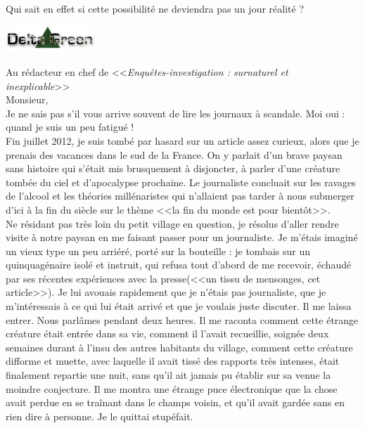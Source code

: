 \documentclass[11pt,twoside,a4paper]{article}
\begin{document}
Qui sait en effet si cette possibilit{\'e} ne deviendra pas un jour r{\'e}alit{\'e} ? ~\\

\vfill

\begin{center} \includegraphics[width=0.25\textwidth]{logo_DG.jpg} \end{center}

\vfill

\clearpage

\begin{minipage}[ht]{0.75\textwidth}
	\begin{ttfamily}	\footnotesize %
		Au r{\'e}dacteur en chef de <<\emph{Enqu{\^e}tes-investigation : surnaturel et inexplicable}>>~\\

Monsieur, ~\\

Je ne sais pas s'il vous arrive souvent de lire les journaux {\`a} scandale. Moi oui : quand je suis un peu fatigu{\'e} !~\\

Fin juillet 2012, je suis tomb{\'e} par hasard sur un article assez curieux, alors que je prenais des vacances dans le sud de la France. On y parlait d'un brave paysan sans histoire qui s'{\'e}tait mis brusquement {\`a} disjoncter, {\`a} parler d'une cr{\'e}ature tomb{\'e}e du ciel et d'apocalypse prochaine. Le journaliste concluait sur les ravages de l'alcool et les th{\'e}ories mill{\'e}naristes qui n'allaient pas tarder {\`a} nous submerger d'ici {\`a} la fin du si{\`e}cle sur le th{\`e}me <<la fin du monde est pour bient{\^o}t>>. ~\\ 

Ne r{\'e}sidant pas tr{\`e}s loin du petit village en question, je r{\'e}solus d'aller rendre visite {\`a} notre paysan en me faisant passer pour un journaliste. Je m'{\'e}tais imagin{\'e} un vieux type un peu arri{\'e}r{\'e}, port{\'e} sur la bouteille : je tombais sur un quinquag{\'e}naire isol{\'e} et instruit, qui refusa tout d'abord de me recevoir, {\'e}chaud{\'e} par ses r{\'e}centes exp{\'e}riences avec la presse(<<un tissu de mensonges, cet article>>). Je lui avouais rapidement que je n'{\'e}tais pas journaliste, que je m'int{\'e}ressais {\`a} ce qui lui {\'e}tait arriv{\'e} et que je voulais juste discuter. Il me laissa entrer. Nous parl{\^a}mes pendant deux heures. Il me raconta comment cette {\'e}trange cr{\'e}ature {\'e}tait entr{\'e}e dans sa vie, comment il l'avait recueillie, soign{\'e}e deux semaines durant {\`a} l'insu des autres habitants du village, comment cette cr{\'e}ature difforme et muette, avec laquelle il avait tiss{\'e} des rapports tr{\`e}s intenses, {\'e}tait finalement repartie une nuit, sans qu'il ait jamais pu {\'e}tablir sur sa venue la moindre conjecture. Il me montra une {\'e}trange puce {\'e}lectronique que la chose avait perdue en se tra{\^i}nant dans le champs voisin, et qu'il avait gard{\'e}e sans en rien dire {\`a} personne. Je le quittai stup{\'e}fait. ~\\


\end{ttfamily}
\end{minipage}
\end{document}
